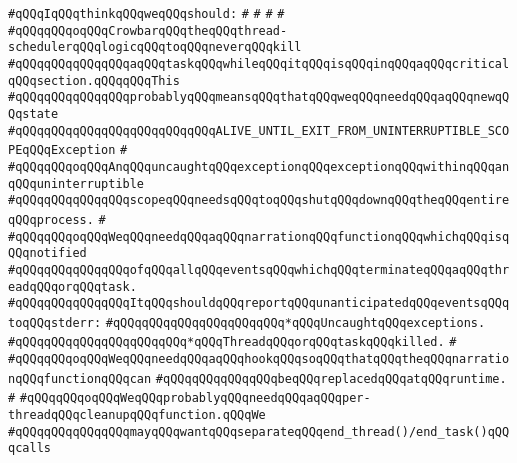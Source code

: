\label{src/lib/src/lib/thread-kit/src/core-thread-kit/microthread.api}
\verb|#qQQqIqQQqthinkqQQqweqQQqshould:|\newline
\verb|#|\newline
\verb|#|\newline
\verb|#|\newline
\verb|#|\newline
\verb|#qQQqqQQqoqQQqCrowbarqQQqtheqQQqthread-schedulerqQQqlogicqQQqtoqQQqneverqQQqkill|\newline
\verb|#qQQqqQQqqQQqqQQqaqQQqtaskqQQqwhileqQQqitqQQqisqQQqinqQQqaqQQqcriticalqQQqsection.qQQqqQQqThis|\newline
\verb|#qQQqqQQqqQQqqQQqprobablyqQQqmeansqQQqthatqQQqweqQQqneedqQQqaqQQqnewqQQqstate|\newline
\verb|#qQQqqQQqqQQqqQQqqQQqqQQqqQQqALIVE_UNTIL_EXIT_FROM_UNINTERRUPTIBLE_SCOPEqQQqException|\newline
\verb|#|\newline
\verb|#qQQqqQQqoqQQqAnqQQquncaughtqQQqexceptionqQQqexceptionqQQqwithinqQQqanqQQquninterruptible|\newline
\verb|#qQQqqQQqqQQqqQQqscopeqQQqneedsqQQqtoqQQqshutqQQqdownqQQqtheqQQqentireqQQqprocess.|\newline
\verb|#|\newline
\verb|#qQQqqQQqoqQQqWeqQQqneedqQQqaqQQqnarrationqQQqfunctionqQQqwhichqQQqisqQQqnotified|\newline
\verb|#qQQqqQQqqQQqqQQqofqQQqallqQQqeventsqQQqwhichqQQqterminateqQQqaqQQqthreadqQQqorqQQqtask.|\newline
\verb|#qQQqqQQqqQQqqQQqItqQQqshouldqQQqreportqQQqunanticipatedqQQqeventsqQQqtoqQQqstderr:|\newline
\verb|#qQQqqQQqqQQqqQQqqQQqqQQq*qQQqUncaughtqQQqexceptions.|\newline
\verb|#qQQqqQQqqQQqqQQqqQQqqQQq*qQQqThreadqQQqorqQQqtaskqQQqkilled.|\newline
\verb|#|\newline
\verb|#qQQqqQQqoqQQqWeqQQqneedqQQqaqQQqhookqQQqsoqQQqthatqQQqtheqQQqnarrationqQQqfunctionqQQqcan|\newline
\verb|#qQQqqQQqqQQqqQQqbeqQQqreplacedqQQqatqQQqruntime.|\newline
\verb|#|\newline
\verb|#qQQqqQQqoqQQqWeqQQqprobablyqQQqneedqQQqaqQQqper-threadqQQqcleanupqQQqfunction.qQQqWe|\newline
\verb|#qQQqqQQqqQQqqQQqmayqQQqwantqQQqseparateqQQqend_thread()/end_task()qQQqcalls|\newline
